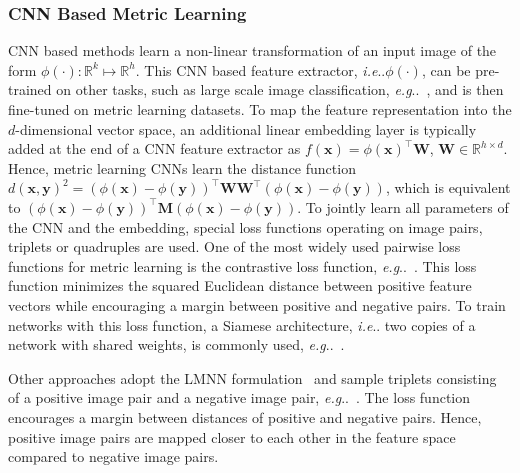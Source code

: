 \documentclass[10pt,journal,compsoc]{IEEEtran}
\makeatletter
\DeclareRobustCommand\onedot{\futurelet\@let@token\@onedot}
\def\@onedot{\ifx\@let@token.\else.\null\fi\xspace}
\def\eg{\emph{e.g}\onedot} \def\Eg{\emph{E.g}\onedot}
\def\ie{\emph{i.e}\onedot} \def\Ie{\emph{I.e}\onedot}
\makeatother
\begin{document}
\subsubsection{CNN Based Metric Learning}\ac{CNN} based methods learn a non-linear transformation of an input image of 
the form $\phi(\cdot): \mathbb{R}^k \mapsto \mathbb{R}^h$. This \ac{CNN} based 
feature extractor, \ie$\phi(\cdot)$, can be pre-trained on 
other tasks, such as large scale image classification, \eg~\cite{ILSVRC15}, and is then 
fine-tuned on metric learning datasets.
To map the feature
representation into the $d$-dimensional vector space, an additional linear embedding layer
is typically added at the end of a \ac{CNN} feature extractor 
as ${f(\boldsymbol{x}) = \phi(\boldsymbol{x})^{\top}\boldsymbol{W}}$, ${\boldsymbol{W} \in \mathbb{R}^{h \times d}}$.
Hence, metric learning \acp{CNN} learn the distance function
 ${d(\boldsymbol{x}, \boldsymbol{y})^2 = (\phi(\boldsymbol{x}) - \phi(\boldsymbol{y}))^{\top}\boldsymbol{W}\boldsymbol{W}^{\top}(\phi(\boldsymbol{x}) - \phi(\boldsymbol{y}))}$,
which is equivalent to $(\phi(\boldsymbol{x}) - \phi(\boldsymbol{y}))^{\top}\boldsymbol{M}(\phi(\boldsymbol{x}) - \phi(\boldsymbol{y}))$.
To jointly learn all parameters of the \ac{CNN} and the embedding, special loss functions operating on image pairs, 
triplets or quadruples are used.
One of the most widely used pairwise loss functions for metric learning is the contrastive 
loss function, \eg~\cite{chopra2005contrastive, hadsell2006dimensionality, oh2016deep}. This loss function 
minimizes the squared Euclidean distance between positive feature vectors while encouraging
a margin between positive and negative pairs. To train networks with this loss function, a Siamese architecture, \ie two copies
of a network with shared weights, is commonly used, \eg~\cite{chopra2005contrastive, hadsell2006dimensionality}.

Other approaches adopt the \ac{LMNN} formulation~\cite{weinberger2009distance}
and sample triplets consisting of a positive image pair and a negative image
pair, \eg~\cite{oh2016deep, parkhi2015deep, schroff2015facenet, wohlhart2015learning}.  The loss function encourages a margin
between distances of positive and negative pairs. Hence, positive image pairs
are mapped closer to each other in the feature space compared to negative 
image pairs.
\end{document}
